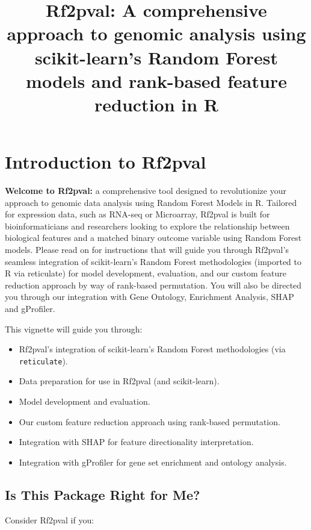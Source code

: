 \documentclass[
]{article}
\title{Rf2pval: A comprehensive approach to genomic analysis using
scikit-learn's Random Forest models and rank-based feature reduction in
R}
\author{\VignetteEngine{knitr::rmarkdown}}
\date{\VignetteEncoding{UTF-8}}
\begin{document}
\maketitle

\hypertarget{introduction-to-rf2pval}{%
\section{Introduction to Rf2pval}\label{introduction-to-rf2pval}}

\textbf{Welcome to Rf2pval:} a comprehensive tool designed to
revolutionize your approach to genomic data analysis using Random Forest
Models in R. Tailored for expression data, such as RNA-seq or
Microarray, Rf2pval is built for bioinformaticians and researchers
looking to explore the relationship between biological features and a
matched binary outcome variable using Random Forest models. Please read
on for instructions that will guide you through Rf2pval's seamless
integration of scikit-learn's Random Forest methodologies (imported to R
via reticulate) for model development, evaluation, and our custom
feature reduction approach by way of rank-based permutation. You will
also be directed you through our integration with Gene Ontology,
Enrichment Analysis, SHAP and gProfiler.

This vignette will guide you through:

\begin{itemize}
\item
  Rf2pval's integration of scikit-learn's Random Forest methodologies
  (via \texttt{reticulate}).
\item
  Data preparation for use in Rf2pval (and scikit-learn).
\item
  Model development and evaluation.
\item
  Our custom feature reduction approach using rank-based permutation.
\item
  Integration with SHAP for feature directionality interpretation.
\item
  Integration with gProfiler for gene set enrichment and ontology
  analysis.
\end{itemize}

\hypertarget{is-this-package-right-for-me}{%
\subsection{Is This Package Right for
Me?}\label{is-this-package-right-for-me}}

Consider Rf2pval if you:
\end{document}
